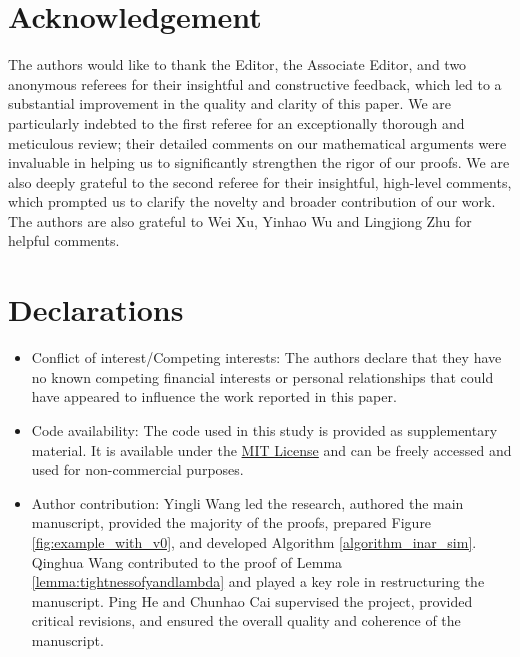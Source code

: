 \documentclass[letterpaper]{article}
\numberwithin{equation}{section}
\theoremstyle{definition}
\theoremstyle{remark}
\begin{document}
\section*{Acknowledgement}
The authors would like to thank the Editor, the Associate Editor, and two anonymous referees for their insightful and constructive feedback, which led to a substantial improvement in the quality and clarity of this paper. 
We are particularly indebted to the first referee for an exceptionally thorough and meticulous review; their detailed comments on our mathematical arguments were invaluable in helping us to significantly strengthen the rigor of our proofs. We are also deeply grateful to the second referee for their insightful, high-level comments, which prompted us to clarify the novelty and broader contribution of our work.
The authors are also grateful to Wei Xu, Yinhao Wu and Lingjiong Zhu for helpful comments.


\section*{Declarations}

\begin{itemize}
\item Conflict of interest/Competing interests: The authors declare that they have no known competing financial interests or personal relationships that could have appeared to influence the work reported in this paper.
\item Code availability: The code used in this study is provided as supplementary material. It is available under the \href{https://opensource.org/licenses/MIT}{MIT License} and can be freely accessed and used for non-commercial purposes.
\item Author contribution: Yingli Wang led the research, authored the main manuscript, provided the majority of the proofs, prepared Figure \ref{fig:example_with_v0}, and developed Algorithm \ref{algorithm_inar_sim}. Qinghua Wang contributed to the proof of Lemma \ref{lemma:tightnessofyandlambda} and played a key role in restructuring the manuscript. Ping He and Chunhao Cai supervised the project, provided critical revisions, and ensured the overall quality and coherence of the manuscript.
\end{itemize}

\end{document}
